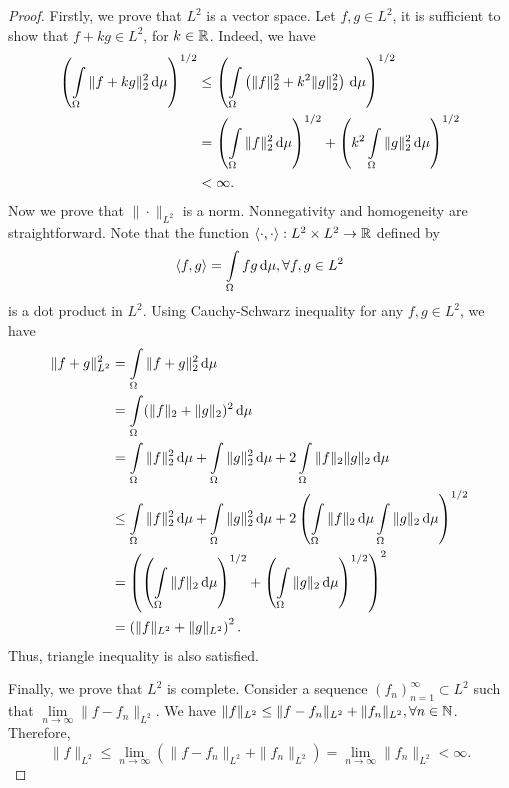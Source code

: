 \begin{proof}
 Firstly, we prove that $L^2$ is a vector space. Let $f,g \in L^2$, it is sufficient to show that $f+kg\in L^2$, for $k\in\mathbb{R}$. Indeed, we have
 \begin{align*}
  \left(\int\limits_\Omega \|f + kg\|^2_2\,\mathrm{d} \mu\right)^{1/2}
   & \le \left(\int\limits_\Omega \left(\|f\|^2_2 + k^2\|g\|^2_2\right)\,\mathrm{d} \mu\right)^{1/2}                               \\
   & = \left(\int\limits_\Omega \|f\|^2_2\,\mathrm{d} \mu\right)^{1/2}  + \left(k^2\int\limits_\Omega \|g\|^2_2\,\mathrm{d} \mu\right)^{1/2} \\
   & < \infty.
 \end{align*}
 Now we prove that $\|\cdot\|_{L^2}$ is a norm. Nonnegativity and homogeneity are straightforward. Note that the function
 $\langle \cdot, \cdot\rangle : L^2 \times L^2\to \mathbb{R}$ defined by
 \begin{equation}
  \langle f,g \rangle = \int\limits_\Omega fg \,\mathrm{d} \mu, \forall f,g\in L^2
 \end{equation}
 is a dot product in $L^2$. Using Cauchy-Schwarz inequality for any $f,g\in L^2$, we have
 \begin{align*}
  \|f + g\|_{L^2}^2
   & = \int\limits_\Omega \|f + g\|^2_2\,\mathrm{d} \mu                                                                                                                             \\
   & = \int\limits_\Omega (\|f\|_2 +\|g\|_2)^2\,\mathrm{d} \mu                                                                                                                      \\
   & = \int\limits_\Omega \|f\|_2^2\,\mathrm{d} \mu + \int\limits_\Omega \|g\|_2^2\,\mathrm{d} \mu + 2\int\limits_\Omega \|f\|_2\|g\|_2\,\mathrm{d} \mu                                                 \\
   & \le  \int\limits_\Omega \|f\|_2^2\,\mathrm{d} \mu + \int\limits_\Omega \|g\|_2^2\,\mathrm{d} \mu + 2\left(\int\limits_\Omega \|f\|_2\,\mathrm{d} \mu \int\limits_\Omega \|g\|_2\,\mathrm{d} \mu\right)^{1/2} \\
   & = \left( \left(\int\limits_\Omega \|f\|_2\,\mathrm{d} \mu\right)^{1/2} + \left(\int\limits_\Omega \|g\|_2\,\mathrm{d} \mu\right)^{1/2} \right)^2                                         \\
   & = \left(\|f\|_{L^2} + \|g\|_{L^2}\right)^2.
 \end{align*}
 Thus, triangle inequality is also satisfied.

 Finally, we prove that $L^2$ is complete. Consider a sequence $(f_n)_{n=1}^\infty\subset L^2$ such that $\lim\limits_{n\to\infty}\|f-f_n\|_{L^2}$. We have $\|f\|_{L^2}\le \|f-f_n\|_{L^2} + \|f_n\|_{L^2}, \forall n\in \mathbb{N}$. Therefore,
 $$\|f\|_{L^2} \le \lim\limits_{n\to\infty}\left(\|f-f_n\|_{L^2} + \|f_n\|_{L^2}\right) = \lim\limits_{n\to\infty} \|f_n\|_{L^2} < \infty.$$
\end{proof}

